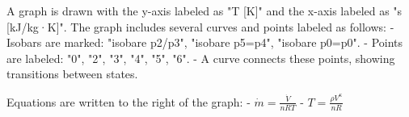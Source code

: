A graph is drawn with the y-axis labeled as "T [K]" and the x-axis labeled as "s [kJ/kg·K]". The graph includes several curves and points labeled as follows:  
- Isobars are marked: "isobare p2/p3", "isobare p5=p4", "isobare p0=p0".  
- Points are labeled: "0", "2", "3", "4", "5", "6".  
- A curve connects these points, showing transitions between states.  

Equations are written to the right of the graph:  
- \( \dot{m} = \frac{\dot{V}}{nRT} \)  
- \( T = \frac{\rho V^{\kappa}}{nR} \)